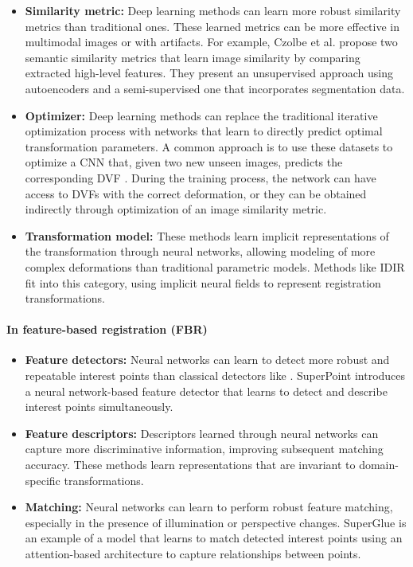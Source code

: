 \begin{itemize}
\item \textbf{Similarity metric:} Deep learning methods can learn more robust similarity metrics than traditional ones. These learned metrics can be more effective in multimodal images or with artifacts.
For example, Czolbe et al. \cite{semanticsimilarity} propose two semantic similarity metrics that learn image similarity by comparing extracted high-level features. They present an unsupervised approach using autoencoders and a semi-supervised one that incorporates segmentation data.
\item \textbf{Optimizer:} Deep learning methods can replace the traditional iterative optimization process with networks that learn to directly predict optimal transformation parameters. A common approach is to use these datasets to optimize a CNN that, given two new unseen images, predicts the corresponding DVF \cite{defregcnn}. During the training process, the network can have access to DVFs with the correct deformation, or they can be obtained indirectly through optimization of an image similarity metric.
\item \textbf{Transformation model:} These methods learn implicit representations of the transformation through neural networks, allowing modeling of more complex deformations than traditional parametric models. Methods like IDIR \cite{wolterink2021implicit} fit into this category, using implicit neural fields to represent registration transformations.
\end{itemize}

\paragraph{In feature-based registration (FBR)}
\label{par:FBR_substitution}

\begin{itemize}
\item \textbf{Feature detectors:} Neural networks can learn to detect more robust and repeatable interest points than classical detectors like . SuperPoint \cite{superpoint} introduces a neural network-based feature detector that learns to detect and describe interest points simultaneously.
\item \textbf{Feature descriptors:} Descriptors learned through neural networks can capture more discriminative information, improving subsequent matching accuracy. These methods learn representations that are invariant to domain-specific transformations.
\item \textbf{Matching:} Neural networks can learn to perform robust feature matching, especially in the presence of illumination or perspective changes. SuperGlue \cite{superglue} is an example of a model that learns to match detected interest points using an attention-based architecture to capture relationships between points.
\end{itemize}

